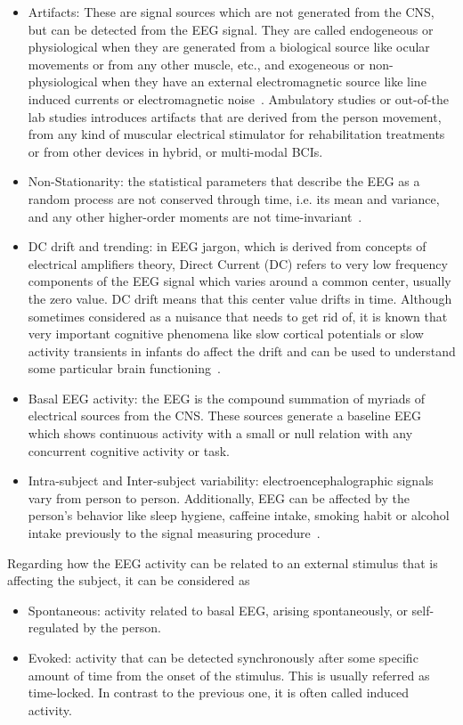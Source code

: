 \begin{itemize}
\item Artifacts:  These are signal sources which are not generated from the CNS, but can be detected from the EEG signal.  They are called endogeneous or physiological when they are generated from a biological source like ocular movements or from any other muscle, etc., and exogeneous or non-physiological when they have an external electromagnetic source like line induced currents or electromagnetic noise~\cite{Weeda2012}.  Ambulatory studies or out-of-the lab studies introduces artifacts that are derived from the person movement, from any kind of muscular electrical stimulator for rehabilitation treatments or from other devices in hybrid, or multi-modal BCIs.
\item Non-Stationarity: the statistical parameters that describe the EEG as a random process are not conserved through time, i.e. its mean and variance, and any other higher-order moments are not time-invariant~\cite{Jansen1991}.
\item DC drift and trending: in EEG jargon, which is derived from concepts of electrical amplifiers theory, Direct Current (DC) refers to very low frequency components of the EEG signal which varies around a common center, usually the zero value.  DC drift means that this center value drifts in time.  Although sometimes considered as a nuisance that needs to get rid of, it is known that very important cognitive phenomena like slow cortical potentials or slow activity transients in infants do affect the drift and can be used to understand some particular brain functioning~\cite{Vanhatalo2005,Schomer2010}.
\item Basal EEG activity: the EEG is the compound summation of myriads of electrical sources from the CNS.  These sources generate a baseline EEG which shows continuous activity with a small or null relation with any concurrent cognitive activity or task.
\item Intra-subject and Inter-subject variability: electroencephalographic signals vary from person to person.  Additionally, EEG can be affected by the person's behavior like sleep hygiene, caffeine intake, smoking habit or alcohol intake previously to the signal measuring procedure~\cite{Farzan2017}.
\end{itemize}

Regarding how the EEG activity can be related to an external stimulus that is affecting the subject, it can be considered as

\begin{itemize}
\item Spontaneous: activity related to basal EEG, arising spontaneously, or self-regulated by the person.
\item Evoked: activity that can be detected synchronously after some specific amount of time from the onset of the stimulus.  This is usually referred as time-locked.  In contrast to the previous one, it is often called induced activity.
\end{itemize}

